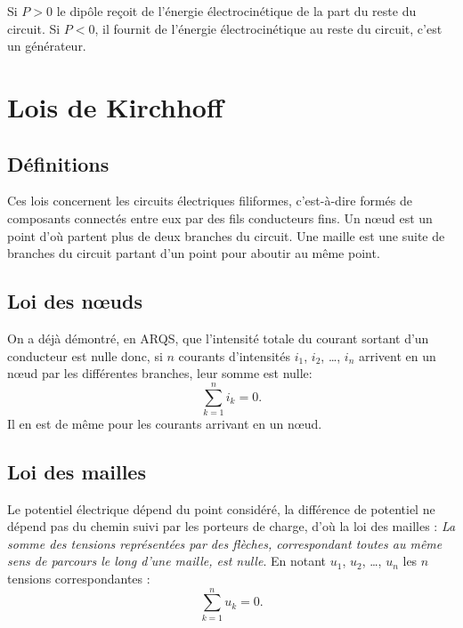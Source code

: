 Si \(P  > 0\) le dipôle reçoit de l'énergie électrocinétique de la part du 
reste du circuit. Si \(P < 0\), il fournit de l'énergie électrocinétique au 
reste du circuit, c'est un générateur.

\section{Lois de Kirchhoff}%
\label{chap9-sec:loisdeKirchhoff}%

\subsection{Définitions}%
\label{chap9-subsec:kirchhoffdef}%

Ces lois concernent les circuits électriques filiformes, c'est-à-dire formés de 
composants connectés entre eux par des fils conducteurs fins. Un n\oe{}ud est 
un point d'où partent plus de deux branches du circuit. Une maille est une 
suite de branches du circuit partant d'un point pour aboutir au même point.

\subsection{Loi des n\oe{}uds}%
\label{chap9-subsec:loidesnoeuds}%

On a déjà démontré, en ARQS, que l'intensité totale du courant sortant d'un 
conducteur est nulle donc, si \(n\) courants d'intensités \(i_1\), \(i_2\), 
\ldots, \(i_n\) arrivent en un nœud par les différentes branches, leur somme
est nulle:
\begin{equation}%
  \sum_{k=1}^n i_k = 0.
\end{equation}%
Il en est de même pour les courants arrivant en un n\oe{}ud.

\subsection{Loi des mailles}%
\label{chap9-subsec:loidesmailles}%

Le potentiel électrique dépend du point considéré, la différence de potentiel 
ne dépend pas du chemin suivi par les porteurs de charge, d'où la loi des 
mailles :
\emph{La somme des tensions représentées par des flèches, correspondant toutes 
au même sens de parcours le long d'une maille, est nulle}. En notant \(u_1\), 
\(u_2\), \ldots, \(u_n\) les \(n\) tensions correspondantes :%
\begin{equation}%
  \sum_{k=1}^n u_k = 0.
\end{equation}%

